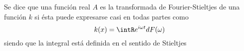 
\begin{defn}
Se dice que una funci\'on real $A$ es la transformada de Fourier-Stieltjes de una funci\'on $k$ si 
\'esta puede expresarse casi en todas partes como
\begin{equation*}
k(x) = \intR e^{ i \omega t} dF(\omega)
\end{equation*}
siendo que la integral est\'a definida en el sentido de Stieltjes
\label{fourier_stieltjes}
\end{defn}

%


